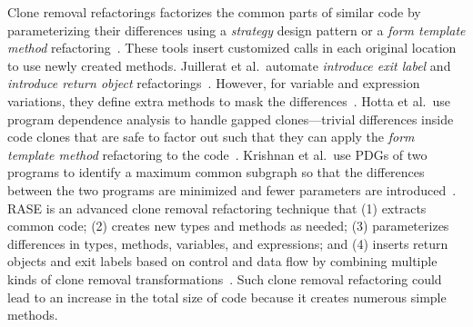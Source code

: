 Clone removal refactorings factorizes the common parts of similar code by parameterizing their differences using a {\em strategy} design pattern or a {\em form template method} refactoring~\cite{Balazinska1999, tairas2012increasing, juillerat2007toward, hotta2012identifying, Tsantalis2013:icsm}. These tools insert customized calls in each original location to use newly created methods. Juillerat et al.~automate {\em introduce exit label} and {\em introduce return object} refactorings~\cite{juillerat2007toward}. However, for variable and expression variations, they define extra methods to mask the differences~\cite{Balazinska1999}. Hotta et al.~use program dependence analysis to handle gapped clones---trivial differences inside code clones that are safe to factor out such that they can apply the {\em form template method} refactoring to the code~\cite{hotta2012identifying}. Krishnan et al.~use PDGs of two programs to identify a maximum common subgraph so that the differences between the two programs are minimized and fewer parameters are introduced~\cite{Tsantalis2013:icsm}. RASE is an advanced clone removal refactoring technique that (1) extracts common code; (2) creates new types and methods as needed; (3) parameterizes differences in types, methods, variables, and expressions; and (4) inserts return objects and exit labels based on control and data flow by combining multiple kinds of clone removal transformations~\cite{Meng2015:ARO}. Such clone removal refactoring could lead to an increase in the total size of code because it creates numerous simple methods. 

